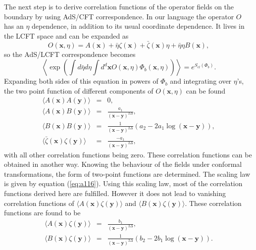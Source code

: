 \documentclass[a4paper,11pt]{article}
\begin{document}
The next step is to derive correlation functions of the operator
fields on the boundary by using AdS/CFT correspondence. In our
language the operator $O$ has an $\eta $ dependence, in addition
to its usual coordinate dependence. It lives in the LCFT space
and can be expanded as
\begin{equation}\label{eq:a129}
O(\mathbf{x},\eta)=A(\mathbf{x})+\bar{\eta}\zeta(\mathbf{x})+
\bar{\zeta}(\mathbf{x})\eta +\bar{\eta}\eta B(\mathbf{x}),
\end{equation}
so the AdS/LCFT correspondence becomes
\begin{equation}\label{eq:a130}
\left\langle \exp\left( \int d\bar{\eta}d\eta \int
d^{d}\mathbf{x}O(\mathbf{x},\eta )\Phi _{b} (\mathbf{x},\eta
)\right) \right\rangle =e^{S_{cl}(\Phi _{b})}. \label{AdS/LCFT}
\end{equation}
Expanding both sides of  this equation in powers of $\Phi _{b}$
and integrating over $\eta $'s, the two point function of
different components of $O(\mathbf{x},\eta )$ can be found
\begin{eqnarray}\label{eq:a131}
\langle A(\mathbf{x})A(\mathbf{y})\rangle &=&0,\nonumber\\
\langle A(\mathbf{x})B(\mathbf{y})
\rangle &=&\frac{a_{1}} {(\mathbf{x}-\mathbf{y})^{2\Delta }},\nonumber\\
\langle B(\mathbf{x})B(\mathbf{y})\rangle  &=&
\frac{1}{(\mathbf{x}-\mathbf{y})^{2\Delta }}(a_{2}-2a_{1}\log
(\mathbf{x}-\mathbf{y})),\nonumber\\
\langle \bar{\zeta}(\mathbf{x})\zeta(\mathbf{y})\rangle
&=&\frac{-a_{1}}{(\mathbf{x}-\mathbf{y})^{2\Delta }},
\end{eqnarray}
with all other correlation functions being zero. These
correlation functions can be obtained in another way. Knowing the
behaviour of the fields under conformal transformations, the form
of two-point functions are determined. The scaling law is given
by equation (\ref{eq:a116}). Using this scaling law, most of the
correlation functions derived here are fulfilled. However it does
not lead to vanishing correlation functions of $ \langle
A(\mathbf{x})\zeta(\mathbf{y})\rangle $ and $\langle
B(\mathbf{x})\zeta(\mathbf{y}) \rangle $. These correlation
functions are found to be
\begin{eqnarray}\label{eq:a135}
 \langle
A(\mathbf{x})\zeta(\mathbf{y})\rangle &=& \frac{b_1}
{\mathbf{(x-y)}^{2\Delta}},\nonumber
\\
\langle B(\mathbf{x})\zeta(\mathbf{y})\rangle &=&
\frac{1}{\mathbf{(x-y)}^{2\Delta}} \left( b_2 -2b_1
\log\mathbf{(x-y)} \right).
\end{eqnarray}
\end{document}
